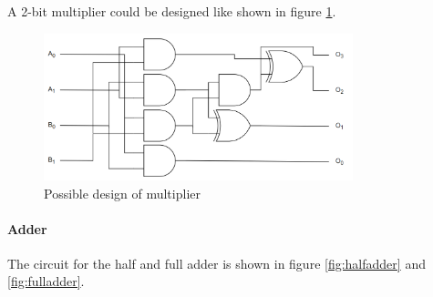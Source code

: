 A 2-bit multiplier could be designed like shown in figure \ref{fig:multiplier}.

\begin{figure}[H]
    \centering
    \includegraphics[width=0.8\textwidth]{Figures/multiplier.png}
    \caption{Possible design of multiplier}
    \label{fig:multiplier}
\end{figure}

\paragraph{Adder}


The circuit for the half and full adder is shown in figure \ref{fig:halfadder} and \ref{fig:fulladder}.

